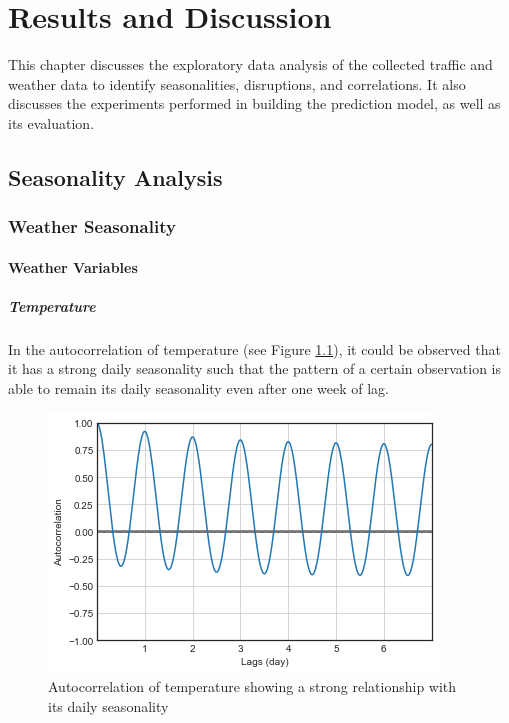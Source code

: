 \chapter{Results and Discussion}

This chapter discusses the exploratory data analysis of the collected traffic and weather data to identify seasonalities, disruptions, and correlations. It also discusses the experiments performed in building the prediction model, as well as its evaluation.
\section{Seasonality Analysis}
\subsection{Weather Seasonality}

\subsubsection{Weather Variables}

\paragraph{Temperature}
In the autocorrelation of temperature (see Figure \ref{figure_autocorr_temp}), it could be observed that it has a strong daily seasonality such that the pattern of a certain observation is able to remain its daily seasonality even after one week of lag. 


\begin{figure}
  \includegraphics[width=\linewidth]{figures/figure_autocorr_temp.png}
  \caption{Autocorrelation of temperature showing a strong relationship with its daily seasonality}
  \label{figure_autocorr_temp}
\end{figure}



